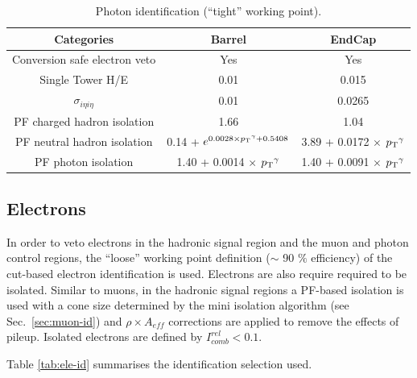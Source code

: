\begin{table}[ht!]
  \caption{Photon identification (``tight'' working point).\label{tab:photon-id-gamma}}
  \centering
  \footnotesize
  \begin{tabular}{ ccc }
    \hline
    \hline
    Categories                    & Barrel                             & EndCap                             \\
    \hline
    Conversion safe electron veto & Yes                                & Yes                                \\
    Single Tower H/E              & 0.01                               & 0.015                               \\
    $\sigma_{i\eta i\eta}$        & 0.01                               & 0.0265                               \\
    PF charged hadron isolation   & 1.66                               & 1.04                               \\
    PF neutral hadron isolation   & 0.14 + $ e^{0.0028 \times {p_{\text T}}^{\gamma} + 0.5408}$  &  3.89 + 0.0172 $\times$ ${p_{\text T}}^{\gamma}$\\
    PF photon isolation           & 1.40 + 0.0014 $\times$ ${p_{\text T}}^{\gamma}$ & 1.40 + 0.0091 $\times$ ${p_{\text T}}^{\gamma}$ \\
    \hline
    \hline
  \end{tabular}
  \end{table}

\subsection{Electrons}
\label{sec:electron-id}
In order to veto electrons in the hadronic signal region and the muon
and photon control regions, the ``loose'' working point definition
($\sim$ 90 $\%$ efficiency) of the cut-based electron identification
\cite{electron-id} is used.  Electrons are also require required to be
isolated.  Similar to muons, in the hadronic signal regions a PF-based
isolation \cite{pf-photon} is used with a cone size determined by the
mini isolation algorithm (see Sec.~\ref{sec:muon-id}) and $\rho\times
A_{eff}$ corrections are applied to remove the effects of pileup.
Isolated electrons are defined by $I^{rel}_{comb} < 0.1$.

Table \ref{tab:ele-id} summarises the identification 
selection used. 

